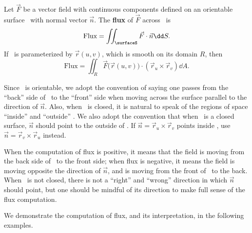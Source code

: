 \begin{definition}\label{def:surfflux}%
Let $\vec F$ be a vector field with continuous components defined on an orientable surface \surfaceS\ with normal vector $\vec n$. The \textbf{flux} of $\vec F$ across \surfaceS\ is
\[\text{Flux} = \iint_{\surfaceS} \vec F\cdot \vec n\dd S.\]
If \surfaceS\ is parameterized by $\vec r(u,v)$, which is smooth on its domain $R$, then
\[
\text{Flux} = \iint_R \vec F\bigl(\vec r(u,v)\bigr)\cdot (\vec r_u\times \vec r_v)\dd A.
\]
\end{definition}

Since \surfaceS\ is orientable, we adopt the convention of saying one passes from the ``back'' side of \surfaceS\ to the ``front'' side when moving across the surface parallel to the direction of $\vec n$. Also, when \surfaceS\ is closed, it is natural to speak of the regions of space ``inside'' and ``outside'' \surfaceS. We also adopt the convention that when \surfaceS\ is a closed surface, $\vec n$ should point to the outside of \surfaceS. If $\vec n = \vec r_u\times\vec r_v$ points inside \surfaceS, use $\vec n = \vec r_v\times \vec r_u$ instead.

When the computation of flux is positive, it means that the field is moving from the back side of \surfaceS\ to the front side; when flux is negative, it means the field is moving opposite the direction of $\vec n$, and is moving from the front of \surfaceS\ to the back. When \surfaceS\ is not closed, there is not a ``right'' and ``wrong'' direction in which $\vec n$ should point, but one should be mindful of its direction to make full sense of the flux computation.

We demonstrate the computation of flux, and its interpretation, in the following examples.


